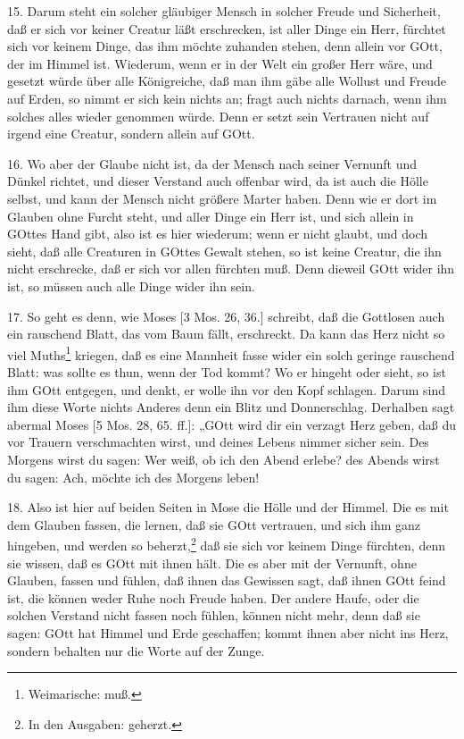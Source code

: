 15. Darum steht ein solcher gläubiger Mensch in solcher Freude und Sicherheit, daß er sich vor keiner Creatur läßt erschrecken, ist aller Dinge ein Herr, fürchtet sich vor keinem Dinge, das ihm möchte zuhanden stehen, denn allein vor GOtt, der im Himmel ist. Wiederum, wenn er in der Welt ein großer Herr wäre, und gesetzt würde über alle Königreiche, daß man ihm gäbe alle Wollust und Freude auf Erden, so nimmt er sich kein nichts an; fragt auch nichts darnach, wenn ihm solches alles wieder genommen würde. Denn er setzt sein Vertrauen nicht auf irgend eine Creatur, sondern allein auf GOtt.

16. Wo aber der Glaube nicht ist, da der Mensch nach seiner Vernunft und Dünkel richtet, und dieser Verstand auch offenbar wird, da ist auch die Hölle selbst, und kann der Mensch nicht größere Marter haben. Denn wie er dort im Glauben ohne Furcht steht, und aller Dinge ein Herr ist, und sich allein in GOttes Hand gibt, also ist es hier wiederum; wenn er nicht glaubt, und doch sieht, daß alle Creaturen in GOttes Gewalt stehen, so ist keine Creatur, die ihn nicht erschrecke, daß er sich vor allen fürchten muß. Denn dieweil GOtt wider ihn ist, so müssen auch alle Dinge wider ihn sein.

17. So geht es denn, wie Moses [3 Mos. 26, 36.] schreibt, daß die Gottlosen auch ein rauschend Blatt, das vom Baum fällt, erschreckt. Da kann das Herz nicht so viel Muths\footnote{Weimarische: muß.} kriegen, daß es eine Mannheit fasse wider ein solch geringe rauschend Blatt: was sollte es thun, wenn der Tod kommt? Wo er hingeht oder sieht, so ist ihm GOtt entgegen, und denkt, er wolle ihn vor den Kopf schlagen. Darum sind ihm diese Worte nichts Anderes denn ein Blitz und Donnerschlag. Derhalben sagt abermal Moses [5 Mos. 28, 65. ff.]: „GOtt wird dir ein verzagt Herz geben, daß du vor Trauern verschmachten wirst, und deines Lebens nimmer sicher sein. Des Morgens wirst du sagen: Wer weiß, ob ich den
Abend erlebe? des Abends wirst du sagen: Ach, möchte ich des Morgens leben!

18. Also ist hier auf beiden Seiten in Mose die Hölle und der Himmel. Die es mit dem Glauben fassen, die lernen, daß sie GOtt vertrauen, und sich ihm ganz hingeben, und werden so beherzt,\footnote{In den Ausgaben: geherzt.} daß sie sich vor keinem Dinge fürchten, denn sie wissen, daß es GOtt mit ihnen hält. Die es aber mit der Vernunft, ohne Glauben, fassen und fühlen, daß ihnen das Gewissen sagt, daß ihnen GOtt feind ist, die können weder Ruhe noch Freude haben. Der andere Haufe, oder die solchen Verstand nicht fassen noch fühlen, können nicht mehr, denn daß sie sagen: GOtt hat Himmel und Erde geschaffen; kommt ihnen aber nicht ins Herz, sondern behalten nur die Worte auf der Zunge.

